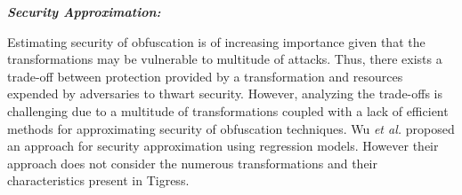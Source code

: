 \emph{\textbf{Security Approximation:}}

Estimating security of obfuscation is of increasing importance given that the transformations may be vulnerable to multitude of attacks. Thus, there exists a trade-off between protection provided by a transformation and resources expended by adversaries to thwart security. However, analyzing the trade-offs is challenging due to a multitude of transformations coupled with a lack of efficient methods for approximating security of obfuscation techniques. Wu \textit{et al.} \cite{wu2010framework} proposed an approach for security approximation using regression models. However their approach does not consider the numerous transformations and their characteristics present in Tigress. 


